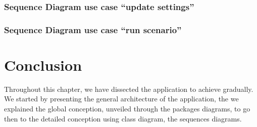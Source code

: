 \documentclass[12pt]{article}
\begin{document}
	\subsubsection{Sequence Diagram use case ``update settings''}
	\clearpage
	\newpage
	\subsubsection{Sequence Diagram use case ``run scenario''}
	\clearpage
	\newpage
	\section{Conclusion}
	Throughout this chapter, we have dissected the application to achieve gradually.
	We started by presenting the general architecture of the application, the we explained the global conception, unveiled through the packages diagrams, to go then to the detailed conception using class diagram, the sequences diagrams.  
	
	
\end{document}
